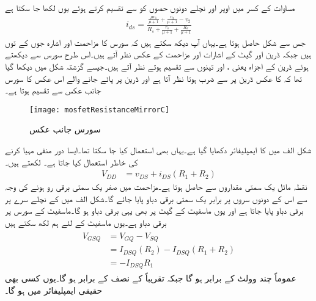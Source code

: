 مساوات  کے  کسر میں اوپر اور نچلے دونوں حصوں کو  سے تقسیم کرتے ہوئے یوں لکھا جا سکتا ہے
\begin{align}\label{مساوات_ماسفیٹ_محاصل_عکس_الف}
i_{ds}=\frac{\frac{\mu v_1}{\mu+1}+\frac{v_3}{\mu+1}- v_2}{R_s+\frac{r_o}{\mu+1}+\frac{R_d}{\mu+1}}
\end{align}
جس سے شکل  حاصل ہوتا ہے۔یہاں آپ دیکھ سکتے ہیں کہ سورس کا مزاحمت  اور اشارہ  جوں کے توں ہیں جبکہ ڈرین اور گیٹ کے اشارات اور مزاحمت کے عکس نظر آتے ہیں۔اس طرح سورس سے دیکھتے ہوئے ڈرین کے اجزاء یعنی ،  اور  تینوں  سے تقسیم ہوتے نظر آتے ہیں۔جیسے گزشتہ شکل میں دیکھا گیا تھا کہ  کا عکس ڈرین پر  سے ضرب ہوتا نظر آتا ہے اور ڈرین پر پائے جانے والے اس عکس کا سورس جانب عکس سے تقسیم ہوتا ہے۔
%
\begin{figure}
\centering
\texttt{[image: mosfetResistanceMirrorC]}
\caption{سورس جانب عکس}
\label{شکل_ماسفیٹ_مزاحمت_کے_عکس_پ}
\end{figure}
شکل  الف میں  کا  ایمپلیفائر دکھایا گیا ہے۔یہاں  بھی استعمال کیا جا سکتا تھا۔ایسا دور منفی  مہیا کرنے کی خاطر استعمال کیا جاتا ہے۔ لکھتے ہیں۔
\begin{align}\label{مساوات_ماسفیت_تابع_مخارج_بار_کا_خط}
V_{DD}&=v_{DS}+i_{DS} \left(R_1+R_2 \right)
\end{align}
نقطہ  مائل یک سمتی مقداروں سے حاصل ہوتا ہے۔مزاحمت  میں صفر یک سمتی برقی رو ہونے کی وجہ سے اس کے دونوں سروں پر برابر یک سمتی برقی دباو پایا جائے گا۔شکل  الف میں  کے نچلے سرے پر  برقی دباو پایا جاتا ہے اور یوں ماسفیٹ کے گیٹ پر بھی یہی برقی دباو ہو گا۔ماسفیٹ کے سورس پر  برقی دباو ہے۔یوں ماسفیٹ کے لئے ہم لکھ سکتے ہیں
\begin{gather}
\begin{aligned}\label{مساوات_ماسفیت_تابع_مخارج_نقطہ _مائل}
V_{GSQ}&=V_{GQ}-V_{SQ}\\
&=I_{DSQ} \left( R_2\right)-I_{DSQ} \left(R_1+R_2 \right)\\
&=-I_{DSQ} R_1
\end{aligned}
\end{gather}
عموماً  چند وولٹ کے برابر ہو گا جبکہ  تقریباً  کے نصف کے برابر ہو گا۔یوں کسی بھی حقیقی ایمپلیفائر میں  ہو گا۔
